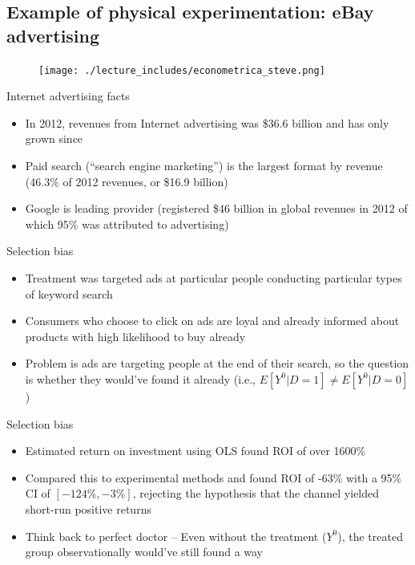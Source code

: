 \documentclass{beamer}
\begin{document}
\subsection{Example of physical experimentation: eBay advertising}

\begin{frame}

\begin{figure}[hpt]
\begin{center}
\texttt{[image: ./lecture\_includes/econometrica\_steve.png]}
\end{center}
\end{figure}

\end{frame}

\begin{frame}{Internet advertising facts}

\begin{itemize}
\item In 2012, revenues from Internet advertising was \$36.6 billion and has only grown since
\item Paid search (``search engine marketing'') is the largest format by revenue (46.3\% of 2012 revenues, or \$16.9 billion)
\item Google is leading provider (registered \$46 billion in global revenues in 2012 of which 95\% was attributed to advertising)
\end{itemize}

\end{frame}

\begin{frame}{Selection bias}

\begin{itemize}
\item Treatment was targeted ads at particular people conducting particular types of keyword search
\item Consumers who choose to click on ads are loyal and already informed about products with high likelihood to buy already 
\item Problem is ads are targeting people at the end of their search, so the question is whether they would've found it already (i.e., $E[Y^0|D=1] \neq E[Y^0|D=0]$)
\end{itemize}


\end{frame}



\begin{frame}{Selection bias}

\begin{itemize}
\item Estimated return on investment using OLS  found ROI of over 1600\%
\item Compared this to experimental methods and found ROI of -63\% with a 95\% CI of $[-124\%, -3\%]$, rejecting the hypothesis that the channel yielded short-run positive returns
\item Think back to perfect doctor -- Even without the treatment ($Y^0$), the treated group observationally would've still found a way
\end{itemize}

\end{frame}
\end{document}
